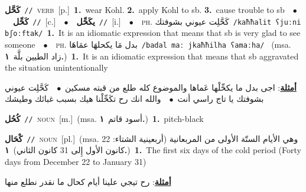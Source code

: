 \documentclass[10pt,a4paper,twoside]{article} %
\begin{document}
\begin{multicols}{2}
{\setlength\topsep{0pt}\textbf{\foreignlanguage{arabic}{كَحَّل}}\ {\color{gray}\texttt{//}\color{black}}\ \textsc{verb}\ [p.]\ \textbf{1.}~wear Kohl.  \textbf{2.}~apply Kohl to sb.  \textbf{3.}~cause trouble to sb\ \ $\bullet$\ \ \setlength\topsep{0pt}\textbf{\foreignlanguage{arabic}{كَحِّل}}\ {\color{gray}\texttt{//}\color{black}}\ [c.]\ \ $\bullet$\ \ \setlength\topsep{0pt}\textbf{\foreignlanguage{arabic}{يكَحِّل}}\ {\color{gray}\texttt{//}\color{black}}\ [i.]\ \ $\bullet$\ \ \textsc{ph.} \color{gray} \foreignlanguage{arabic}{كَحَّلِت عيوني بشوفتك}\color{black}\ {\color{gray}\texttt{/{\sffamily kaħħalit ʕjuːni bʃoːftak}/}\color{black}}\ \textbf{1.}~It is an idiomatic expression that means that sb is very glad to see someone\ \ $\bullet$\ \ \textsc{ph.} \color{gray} \foreignlanguage{arabic}{بدل مَا يكحلهَا عمَاهَا}\color{black}\ {\color{gray}\texttt{/{\sffamily badal maː jkaħħilha ʕamaːha}/}\color{black}}\ \color{gray} (msa. \foreignlanguage{arabic}{زاد الطيين بلَّة}~\foreignlanguage{arabic}{\textbf{١.}})\color{black}\ \textbf{1.}~It is an idiomatic expression that means that sb aggravated the situation unintentionally\  \begin{flushright}\color{gray}\foreignlanguage{arabic}{\textbf{\underline{\foreignlanguage{arabic}{أمثلة}}}: اجى بدل ما يكحِّلْها عَماها والموضوع كله طلع من قبته مسكين\ $\bullet$\ \  كَحَّلِت عيوني بشوفتك يا تاج راسي أنت\ $\bullet$\ \  والله انك رح تكَحِّلْنا هيك بسبب غبائك وطيشك}\end{flushright}\color{black}} \vspace{2mm}

{\setlength\topsep{0pt}\textbf{\foreignlanguage{arabic}{كُحُل}}\ {\color{gray}\texttt{//}\color{black}}\ \textsc{noun}\ [m.]\ \color{gray}(msa. \foreignlanguage{arabic}{أسود قاتم}~\foreignlanguage{arabic}{\textbf{١.}})\color{black}\ \textbf{1.}~pitch-black\ } \vspace{2mm}

{\setlength\topsep{0pt}\textbf{\foreignlanguage{arabic}{كْحَال}}\ {\color{gray}\texttt{//}\color{black}}\ \textsc{noun}\ [pl.]\ \color{gray}(msa. \foreignlanguage{arabic}{وهي الأيام الستّة الأولى من المربعانية (أربعينية الشتاء: 22 كانون الأول إِلى 31 كانون الثاني)}~\foreignlanguage{arabic}{\textbf{١.}})\color{black}\ \textbf{1.}~The first six days of the cold period (Forty days from December 22 to January 31)\  \begin{flushright}\color{gray}\foreignlanguage{arabic}{\textbf{\underline{\foreignlanguage{arabic}{أمثلة}}}: رح تيجي علينا أيام كحال ما نقدر نطلع منها}\end{flushright}\color{black}} \vspace{2mm}


\end{multicols}
\end{document}
